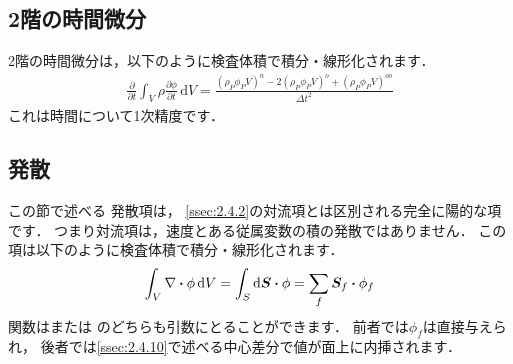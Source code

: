 \subsection{2階の時間微分}
\label{ssec:2.4.4}
%
2階の時間微分は，以下のように検査体積で積分・線形化されます．
\begin{align}
 \label{eq:2.23}
 \frac{\partial}{\partial t}\int_{V}\rho\frac{\partial\phi}{\partial t}\,\mathrm{d}V
 = \frac{(\rho_{P}\phi_{P}V)^{n} - 2(\rho_{P}\phi_{P}V)^{o}
 + (\rho_{P}\phi_{P}V)^{oo}}{\Delta t^{2}}
\end{align}
これは時間について1次精度です．


\subsection{発散}
\label{ssec:2.4.5}
この節で述べる
%
発散項は，
\autoref{ssec:2.4.2}の対流項とは区別される完全に陽的な項です．
つまり対流項は，速度とある従属変数の積の発散ではありません．
この項は以下のように検査体積で積分・線形化されます．
\begin{align}
 \label{eq:2.24}
 \int_{V}\nabla \inProd \phi\,\mathrm{d}V
 = \int_{S}\mathrm{d}\bm{S} \inProd \phi
 = \sum_{f}\bm{S}_{f} \inProd \phi_{f}
\end{align}
関数はまたは
のどちらも引数にとることができます．
前者では$\phi_{f}$は直接与えられ，
後者では\autoref{ssec:2.4.10}で述べる中心差分で値が面上に内挿されます．


